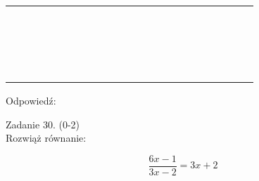 \documentclass[10pt]{article}
\begin{document}
\begin{center}
\begin{tabular}{|c|c|c|c|c|c|c|c|c|c|c|c|c|c|c|c|c|c|c|c|c|c|}
\hline
 &  &  &  &  &  &  &  &  &  &  &  &  &  &  &  &  &  &  &  &  &  \\
\hline
 &  &  &  &  &  &  &  &  &  &  &  &  &  &  &  &  &  &  &  &  &  \\
\hline
 &  &  &  &  &  &  &  &  &  &  &  &  &  &  &  &  &  &  &  &  &  \\
\hline
 &  &  &  &  &  &  &  &  &  &  &  &  &  &  &  &  &  &  &  &  &  \\
\hline
 &  &  &  &  &  &  &  &  &  &  &  &  &  &  &  &  &  &  &  &  &  \\
\hline
 &  &  &  &  &  &  &  &  &  &  &  &  &  &  &  &  &  &  &  &  &  \\
\hline
 &  &  &  &  &  &  &  &  &  &  &  &  &  &  &  &  &  &  &  &  &  \\
\hline
 &  &  &  &  &  &  &  &  &  &  &  &  &  &  &  &  &  &  &  &  &  \\
\hline
 &  &  &  &  &  &  &  &  &  &  &  &  &  &  &  &  &  &  &  &  &  \\
\hline
 &  &  &  &  &  &  &  &  &  &  &  &  &  &  &  &  &  &  &  &  &  \\
\hline
 &  &  &  &  &  &  &  &  &  &  &  &  &  &  &  &  &  &  &  &  &  \\
\hline
 &  &  &  &  &  &  &  &  &  &  &  &  &  &  &  &  &  &  &  &  &  \\
\hline
 &  &  &  &  &  &  &  &  &  &  &  &  &  &  &  &  &  &  &  &  &  \\
\hline
 &  &  &  &  &  &  &  &  &  &  &  &  &  &  &  &  &  &  &  &  &  \\
\hline
 &  &  &  &  &  &  &  &  &  &  &  &  &  &  &  &  &  &  &  &  &  \\
\hline
 &  &  &  &  &  &  &  &  &  &  &  &  &  &  &  &  &  &  &  &  &  \\
\hline
 &  &  &  &  &  &  &  &  &  &  &  &  &  &  &  &  &  &  &  &  &  \\
\hline
 &  &  &  &  &  &  &  &  &  &  &  &  &  &  &  &  &  &  &  &  &  \\
\hline
 &  &  &  &  &  &  &  &  &  &  &  &  &  &  &  &  &  &  &  &  &  \\
\hline
\end{tabular}
\end{center}

Odpowiedź:

Zadanie 30. (0-2)\\
Rozwiąż równanie:

\[
\frac{6 x-1}{3 x-2}=3 x+2
\]
\end{document}
